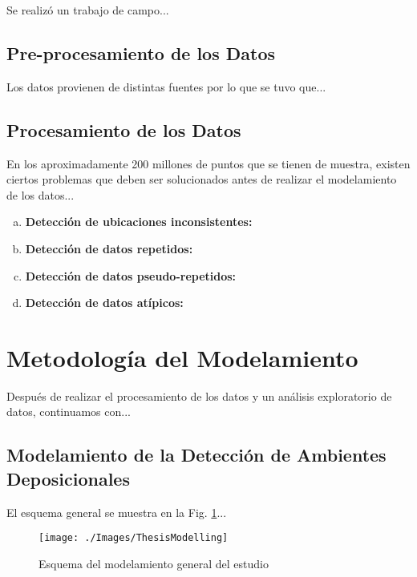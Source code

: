 Se realizó un trabajo de campo...

\subsection{Pre-procesamiento de los Datos}
Los datos provienen de distintas fuentes por lo que se tuvo que...

\subsection{Procesamiento de los Datos}

En los aproximadamente 200 millones de puntos que se tienen de muestra, existen ciertos problemas que deben ser solucionados antes de realizar el modelamiento de los datos...

\begin{enumerate}[a)]
\item \textbf{Detección de ubicaciones inconsistentes:}

\item \textbf{Detección de datos repetidos:}

\item \textbf{Detección de datos pseudo-repetidos:}

\item \textbf{Detección de datos atípicos:}

\end{enumerate}
%
%

\section{Metodología del Modelamiento}

Después de realizar el procesamiento de los datos y un análisis exploratorio de datos, continuamos con...

\subsection{Modelamiento de la Detección de Ambientes Deposicionales}

El esquema general se muestra en la Fig. \ref{fig:ThesisModel}...

\begin{figure}[H]
\centering
\texttt{[image: ./Images/ThesisModelling]}
\caption{Esquema del modelamiento general del estudio}
\label{fig:ThesisModel}
\end{figure}

